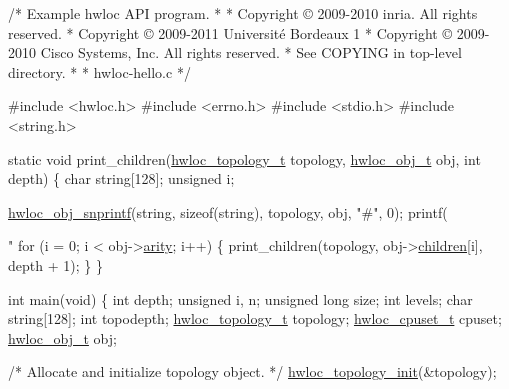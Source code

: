 \begin{DoxyCodeInclude}
\textcolor{comment}{/* Example hwloc API program.}
\textcolor{comment}{ *}
\textcolor{comment}{ * Copyright © 2009-2010 inria.  All rights reserved.}
\textcolor{comment}{ * Copyright © 2009-2011 Université Bordeaux 1}
\textcolor{comment}{ * Copyright © 2009-2010 Cisco Systems, Inc.  All rights reserved.}
\textcolor{comment}{ * See COPYING in top-level directory.}
\textcolor{comment}{ *}
\textcolor{comment}{ * hwloc-hello.c}
\textcolor{comment}{ */}

\textcolor{preprocessor}{#include <hwloc.h>}
\textcolor{preprocessor}{#include <errno.h>}
\textcolor{preprocessor}{#include <stdio.h>}
\textcolor{preprocessor}{#include <string.h>}

\textcolor{keyword}{static} \textcolor{keywordtype}{void} print\_children(\hyperlink{a00039_ga9d1e76ee15a7dee158b786c30b6a6e38}{hwloc_topology_t} topology, \hyperlink{a00016}{hwloc_obj_t} obj, 
                           \textcolor{keywordtype}{int} depth)
\{
    \textcolor{keywordtype}{char} \textcolor{keywordtype}{string}[128];
    \textcolor{keywordtype}{unsigned} i;

    \hyperlink{a00048_ga5c6a61a83f4790b421e2f62e9088446f}{hwloc_obj_snprintf}(\textcolor{keywordtype}{string}, \textcolor{keyword}{sizeof}(\textcolor{keywordtype}{string}), topology, obj, \textcolor{stringliteral}{"#"}, 0);
    printf(\textcolor{stringliteral}{"%
    \textcolor{keywordflow}{for} (i = 0; i < obj->\hyperlink{a00016_aac3f6da35c9b57599909a44ce2b716c1}{arity}; i++) \{
        print\_children(topology, obj->\hyperlink{a00016_a04d05403da37bfe17cd63b7c7dd07b1f}{children}[i], depth + 1);
    \}
\}

\textcolor{keywordtype}{int} main(\textcolor{keywordtype}{void})
\{
    \textcolor{keywordtype}{int} depth;
    \textcolor{keywordtype}{unsigned} i, n;
    \textcolor{keywordtype}{unsigned} \textcolor{keywordtype}{long} size;
    \textcolor{keywordtype}{int} levels;
    \textcolor{keywordtype}{char} \textcolor{keywordtype}{string}[128];
    \textcolor{keywordtype}{int} topodepth;
    \hyperlink{a00039_ga9d1e76ee15a7dee158b786c30b6a6e38}{hwloc_topology_t} topology;
    \hyperlink{a00040_ga4bbf39b68b6f568fb92739e7c0ea7801}{hwloc_cpuset_t} cpuset;
    \hyperlink{a00016}{hwloc_obj_t} obj;

    \textcolor{comment}{/* Allocate and initialize topology object. */}
    \hyperlink{a00043_ga5c2d6f476af87005c7bd0811d4548b9f}{hwloc_topology_init}(&topology);

}
\end{DoxyCodeInclude}
